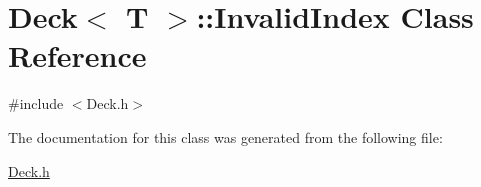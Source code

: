 \hypertarget{class_deck_1_1_invalid_index}{}\section{Deck$<$ T $>$\+:\+:Invalid\+Index Class Reference}
\label{class_deck_1_1_invalid_index}


{\ttfamily \#include $<$Deck.\+h$>$}



The documentation for this class was generated from the following file\+:\begin{DoxyCompactItemize}
\item 
\mbox{\hyperlink{_deck_8h}{Deck.\+h}}\end{DoxyCompactItemize}
